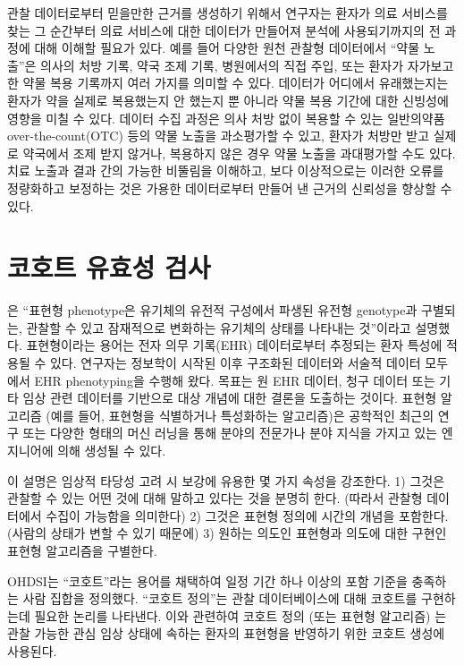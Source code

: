 \documentclass[10.5pt]{book}
\theoremstyle{definition}
\theoremstyle{definition}
\theoremstyle{definition}
\theoremstyle{remark}
\begin{document}
관찰 데이터로부터 믿을만한 근거를 생성하기 위해서 연구자는 환자가 의료
서비스를 찾는 그 순간부터 의료 서비스에 대한 데이터가 만들어져 분석에
사용되기까지의 전 과정에 대해 이해할 필요가 있다. 예를 들어 다양한 원천
관찰형 데이터에서 ``약물 노출''은 의사의 처방 기록, 약국 조제 기록,
병원에서의 직접 주입, 또는 환자가 자가보고한 약물 복용 기록까지 여러
가지를 의미할 수 있다. 데이터가 어디에서 유래했는지는 환자가 약을 실제로
복용했는지 안 했는지 뿐 아니라 약물 복용 기간에 대한 신빙성에 영향을
미칠 수 있다. 데이터 수집 과정은 의사 처방 없이 복용할 수 있는
일반의약품 over-the-count(OTC) 등의 약물 노출을 과소평가할 수 있고,
환자가 처방만 받고 실제로 약국에서 조제 받지 않거나, 복용하지 않은 경우
약물 노출을 과대평가할 수도 있다. 치료 노출과 결과 간의 가능한 비뚤림을
이해하고, 보다 이상적으로는 이러한 오류를 정량화하고 보정하는 것은
가용한 데이터로부터 만들어 낸 근거의 신뢰성을 향상할 수 있다.

\section{코호트 유효성 검사}\label{CohortValidation}

\citet{hripcsak_2017} 은 ``표현형 phenotype은 유기체의 유전적 구성에서
파생된 유전형 genotype과 구별되는, 관찰할 수 있고 잠재적으로 변화하는
유기체의 상태를 나타내는 것''이라고 설명했다. 표현형이라는 용어는 전자
의무 기록(EHR) 데이터로부터 추정되는 환자 특성에 적용될 수 있다.
연구자는 정보학이 시작된 이후 구조화된 데이터와 서술적 데이터 모두에서
EHR phenotyping을 수행해 왔다. 목표는 원 EHR 데이터, 청구 데이터 또는
기타 임상 관련 데이터를 기반으로 대상 개념에 대한 결론을 도출하는
것이다. 표현형 알고리즘 (예를 들어, 표현형을 식별하거나 특성화하는
알고리즘)은 공학적인 최근의 연구 또는 다양한 형태의 머신 러닝을 통해
분야의 전문가나 분야 지식을 가지고 있는 엔지니어에 의해 생성될 수 있다.

이 설명은 임상적 타당성 고려 시 보강에 유용한 몇 가지 속성을 강조한다.
1) 그것은 관찰할 수 있는 어떤 것에 대해 말하고 있다는 것을 분명히 한다.
(따라서 관찰형 데이터에서 수집이 가능함을 의미한다) 2) 그것은 표현형
정의에 시간의 개념을 포함한다. (사람의 상태가 변할 수 있기 때문에) 3)
원하는 의도인 표현형과 의도에 대한 구현인 표현형 알고리즘을 구별한다.

OHDSI는 ``코호트''라는 용어를 채택하여 일정 기간 하나 이상의 포함 기준을
충족하는 사람 집합을 정의했다. ``코호트 정의''는 관찰 데이터베이스에
대해 코호트를 구현하는데 필요한 논리를 나타낸다. 이와 관련하여 코호트
정의 (또는 표현형 알고리즘) 는 관찰 가능한 관심 임상 상태에 속하는
환자의 표현형을 반영하기 위한 코호트 생성에 사용된다.
\end{document}
